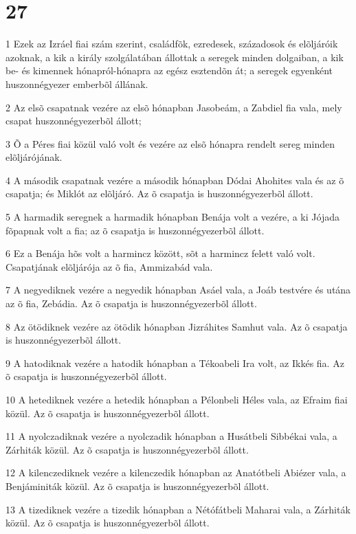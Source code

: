 \chapter{27}

\par 1 Ezek az Izráel fiai szám szerint, családfõk, ezredesek, századosok és elõljáróik azoknak, a kik a király szolgálatában állottak a seregek minden dolgaiban, a kik be- és kimennek hónapról-hónapra az egész esztendõn át; a seregek egyenként huszonnégyezer emberbõl állának.
\par 2 Az elsõ csapatnak vezére az elsõ hónapban Jasobeám, a Zabdiel fia vala, mely csapat huszonnégyezerbõl állott;
\par 3 Õ a Péres fiai közül való volt és vezére az elsõ hónapra rendelt sereg minden elõljárójának.
\par 4 A második csapatnak vezére a második hónapban Dódai Ahohites vala és az õ csapatja; és Miklót az elõljáró. Az õ csapatja is huszonnégyezerbõl állott.
\par 5 A harmadik seregnek a harmadik hónapban Benája volt a vezére, a ki Jójada fõpapnak volt a fia; az õ csapatja is huszonnégyezerbõl állott.
\par 6 Ez a Benája hõs volt a harmincz között, sõt a harmincz felett való volt. Csapatjának elõljárója az õ fia, Ammizabád vala.
\par 7 A negyediknek vezére a negyedik hónapban Asáel vala, a Joáb testvére és utána az õ fia, Zebádia. Az õ csapatja is huszonnégyezerbõl állott.
\par 8 Az ötödiknek vezére az ötödik hónapban Jizráhites Samhut vala. Az õ csapatja is huszonnégyezerbõl állott.
\par 9 A hatodiknak vezére a hatodik hónapban a Tékoabeli Ira volt, az Ikkés fia. Az õ csapatja is huszonnégyezerbõl állott.
\par 10 A hetediknek vezére a hetedik hónapban a Pélonbeli Héles vala, az Efraim fiai közül. Az õ csapatja is huszonnégyezerbõl állott.
\par 11 A nyolczadiknak vezére a nyolczadik hónapban a Husátbeli Sibbékai vala, a Zárhiták közül. Az õ csapatja is huszonnégyezerbõl állott.
\par 12 A kilenczediknek vezére a kilenczedik hónapban az Anatótbeli Abiézer vala, a Benjáminiták közül. Az õ csapatja is huszonnégyezerbõl állott.
\par 13 A tizediknek vezére a tizedik hónapban a Nétófátbeli Maharai vala, a Zárhiták közül. Az õ csapatja is huszonnégyezerbõl állott.
